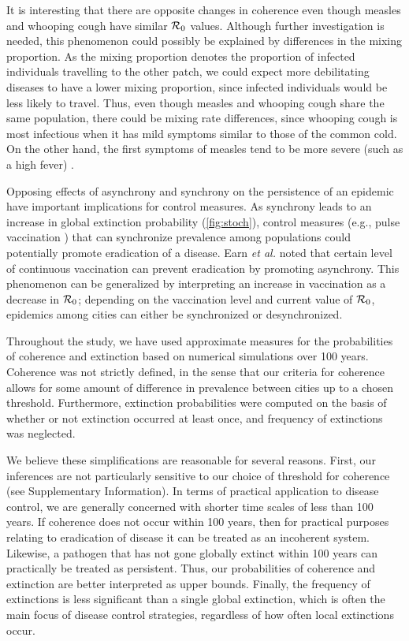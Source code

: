 \documentclass[12pt]{article}
\newcommand{\R}{{\cal R}}
\begin{document}
It is interesting that there are opposite changes in coherence even though measles and whooping cough have similar $\R_0$ values. 
Although further investigation is needed, this phenomenon could possibly be explained by differences in the mixing proportion. 
As the mixing proportion denotes the proportion of infected individuals travelling to the other patch, we could expect more debilitating diseases to have a lower mixing proportion, since infected individuals would be less likely to travel. Thus, even though measles and whooping cough share the same population, there could be mixing rate differences, since whooping cough is most infectious when it has mild symptoms similar to those of the common cold. On the other hand, the first symptoms of measles tend to be more severe (such as a high fever) \cite{CentersforDiseaseControlandPrevention2015, CentersforDiseaseControlandPrevention2017}.

Opposing effects of asynchrony and synchrony on the persistence of an epidemic have important implications for control measures.
As synchrony leads to an increase in global extinction probability (\autoref{fig:stoch}), control measures (e.g., pulse vaccination \cite{agur1993pulse, shulgin1998pulse}) that can synchronize prevalence among populations could potentially promote eradication of a disease.
Earn \textit{et al.} \cite{earn1998persistence} noted that certain level of continuous vaccination can prevent eradication by promoting asynchrony.
This phenomenon can be generalized by interpreting an increase in vaccination as a decrease in $\R_0$; depending on the vaccination level and current value of $\R_0$, epidemics among cities can either be synchronized or desynchronized.

Throughout the study, we have used approximate measures for the probabilities of coherence and extinction based on numerical simulations over 100 years.
Coherence was not strictly defined, in the sense that our criteria for coherence allows for some amount of difference in prevalence between cities up to a chosen threshold.
Furthermore, extinction probabilities were computed on the basis of whether or not extinction occurred at least once, and frequency of extinctions was neglected.

We believe these simplifications are reasonable for several reasons. 
First, our inferences are not particularly sensitive to our choice of threshold for coherence (see Supplementary Information).
In terms of practical application to disease control, we are generally concerned with shorter time scales of less than 100 years. 
If coherence does not occur within 100 years, then for practical purposes relating to eradication of disease it can be treated as an incoherent system.
Likewise, a pathogen that has not gone globally extinct within 100 years can practically be treated as persistent.
Thus, our probabilities of coherence and extinction are better interpreted as upper bounds.
Finally, the frequency of extinctions is less significant than a single global extinction, which is often the main focus of disease control strategies, regardless of how often local extinctions occur.
\end{document}
